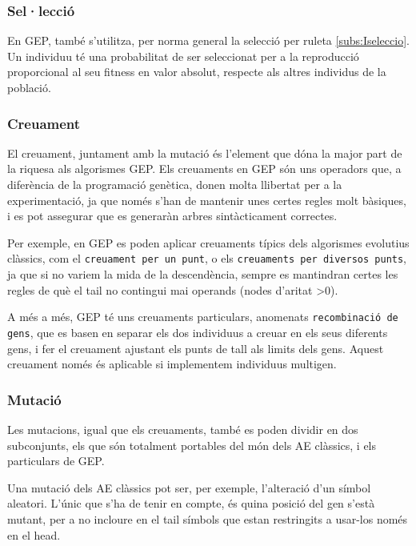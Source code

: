 \subsubsection{Sel·lecció} %
\label{ssub:Seleccio}
En GEP, també s'utilitza, per norma general la selecció per ruleta
\ref{subs:Iseleccio}.  Un individuu té una probabilitat de ser seleccionat per a
la reproducció proporcional al seu fitness en valor absolut, respecte als altres
individus de la població.


\subsubsection{Creuament} %
\label{ssub:Creuament}

El creuament, juntament amb la mutació és l'element que dóna la major part de la
riquesa als algorismes GEP.  Els creuaments en GEP són uns operadors que, a
diferència de la programació genètica, donen molta llibertat per a la
experimentació, ja que només s'han de mantenir unes certes regles molt bàsiques,
i es pot assegurar que es generaràn arbres sintàcticament correctes.

Per exemple, en GEP es poden aplicar creuaments típics dels algorismes evolutius
clàssics, com el \texttt{creuament per un punt}, o els \texttt{creuaments per
diversos punts}, ja que si no variem la mida de la descendència, sempre es
mantindran certes les regles de què el tail no contingui mai operands (nodes
d'aritat >0).

A més a més, GEP té uns creuaments particulars, anomenats \texttt{recombinació
de gens}, que es basen en separar els dos individuus a creuar en els seus
diferents gens, i fer el creuament ajustant els punts de tall als limits dels
gens.  Aquest creuament només és aplicable si implementem individuus multigen.

\subsubsection{Mutació} %
\label{ssub:Mutacio}
Les mutacions, igual que els creuaments, també es poden dividir en dos
subconjunts, els que són totalment portables del món dels AE clàssics, i els
particulars de GEP.

Una mutació dels AE clàssics pot ser, per exemple, l'alteració d'un símbol
aleatori.  L'únic que s'ha de tenir en compte, és quina posició del gen s'està
mutant, per a no incloure en el tail símbols que estan restringits a usar-los
només en el head.

